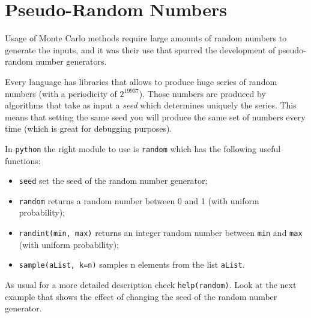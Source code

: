 \section{Pseudo-Random Numbers}\label{pseudo-random-numbers}

Usage of Monte Carlo methods require large amounts of random numbers to
generate the inputs, and it was their use that spurred the development
of pseudo-random number generators. 

Every language has libraries that
allows to produce huge series of random numbers (with a periodicity of
\(2^{19937}\)). Those numbers are produced by algorithms that take as
input a \emph{seed} which determines uniquely the series. This means
that setting the same seed you will produce the same set of numbers
every time (which is great for debugging purposes).

In \texttt{python} the right module to use is \texttt{random} which has the
following useful functions:
\begin{itemize}
\tightlist
\item
  \texttt{seed} set the seed of the random number generator;
\item
  \texttt{random} returns a random number between 0 and 1 (with uniform
  probability);
\item
  \texttt{randint(min,\ max)} returns an integer random number between
  \texttt{min} and \texttt{max} (with uniform probability);
\item
  \texttt{sample(aList,\ k=n)} samples n elements from the list
  \texttt{aList}.
\end{itemize}
As usual for a more detailed description check \texttt{help(random)}. Look at the next example that shows the effect of 
changing the seed of the random number generator.

